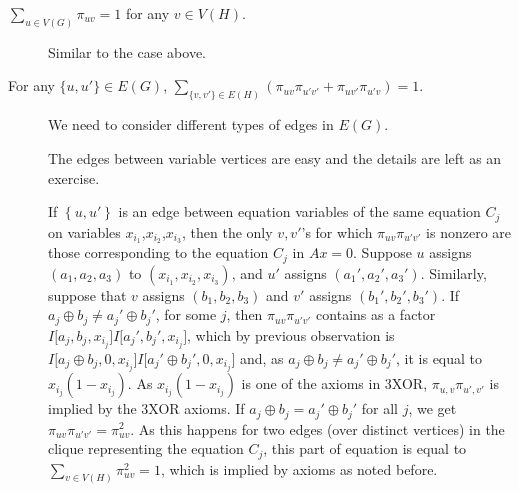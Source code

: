 \documentclass[a4paper,twoside,justified]{tufte-handout}
\begin{document}
\begin{description}
  \item[$\sum_{u \in V(G)} \pi_{uv}=1$ for any $v \in V(H)$.] Similar to the case above.
  \item[For any $\{u,u'\} \in E(G)$, $\sum_{\{v,v'\} \in E(H)} (\pi_{uv}\pi_{u'v'} + \pi_{uv'}\pi_{u'v})= 1$.]
    We need to consider different types of edges in $E(G)$.

    The edges between variable vertices are easy and the details are left as an exercise.

    If $\left\{ u,u' \right\}$ is an edge between equation variables of the same equation 
    $C_j$ on variables $x_{i_1}$,$x_{i_2}$,$x_{i_3}$, then the only $v,v'$'s for which $\pi_{uv}\pi_{u'v'}$
    is nonzero are those corresponding to the equation $C_j$ in $Ax=0$.
    Suppose $u$ assigns $(a_1,a_2,a_3)$ to $(x_{i_1},x_{i_2},x_{i_3})$, and $u'$ assigns $(a_1',a_2',a_3')$.
    Similarly, suppose that $v$ assigns $(b_1,b_2,b_3)$ and $v'$ assigns $(b_1',b_2',b_3')$.
    If $a_j \oplus b_j \neq a_j' \oplus b_j'$, for some $j$, then $\pi_{uv} \pi_{u'v'}$ contains
    as a factor $I\bigl[a_j, b_j, x_{i_j}\bigr] I\bigl[a_j', b_j', x_{i_j}\bigr]$, which by
    previous observation is 
    $I\bigl[a_j \oplus b_j, 0, x_{i_j}\bigr] I\bigl[a_j' \oplus b_j', 0, x_{i_j}\bigr]$ and, as $a_j \oplus b_j \neq a_j' \oplus b_j'$,
    it is equal to $x_{i_j}(1-x_{i_j})$. As $x_{i_j}(1-x_{i_j})$ is one of the axioms 
    in 3XOR,  $\pi_{u, v} \pi_{u', v'}$ is implied by the 3XOR axioms.
    If $a_j \oplus b_j = a_j' \oplus b_j'$ for all $j$, we get
    $\pi_{uv}\pi_{u'v'}=\pi_{uv}^2$. As this happens for two edges (over distinct vertices) 
    in the clique representing the equation $C_j$, this part of equation is equal to
    $\sum_{v \in V(H)} \pi_{uv}^2 = 1$, which is implied by axioms as noted before.
    

\end{description}
\end{document}

